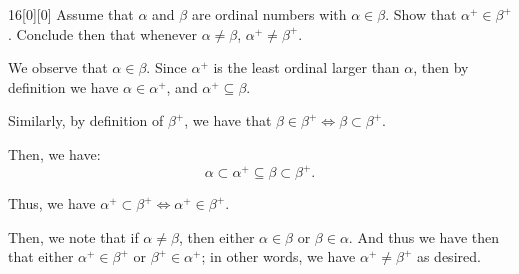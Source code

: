 \documentclass{article}
\begin{document}
\begin{hw}{16}[0][0]
	Assume that $\alpha$ and $\beta$ are ordinal numbers with $\alpha \in \beta$. Show that $\alpha^{+} \in \beta^{+}$. Conclude then that whenever $\alpha \neq \beta$, $\alpha^{+} \neq \beta^{+}$.
\end{hw}
\begin{solution}
	We observe that $\alpha \in \beta$. Since $\alpha^{+}$ is the least ordinal larger than $\alpha$, then by definition we have $\alpha \in \alpha^{+}$, and $\alpha^{+} \subseteq \beta$.
	
	Similarly, by definition of $\beta^{+}$, we have that $\beta \in \beta^{+} \iff \beta \subset \beta^{+}$.
	
	Then, we have:
	\begin{equation*}
		\alpha \subset \alpha^{+} \subseteq \beta \subset \beta^{+}.
	\end{equation*}

	Thus, we have $\alpha^{+} \subset \beta^{+} \iff \alpha^{+} \in \beta^{+}$.
	
	Then, we note that if $\alpha \neq \beta$, then either $\alpha \in \beta$ or $\beta \in \alpha$. And thus we have then that either $\alpha^{+} \in \beta^{+}$ or $\beta^{+} \in \alpha^{+}$; in other words, we have $\alpha^{+} \neq \beta^{+}$ as desired.
\end{solution}
\end{document}

